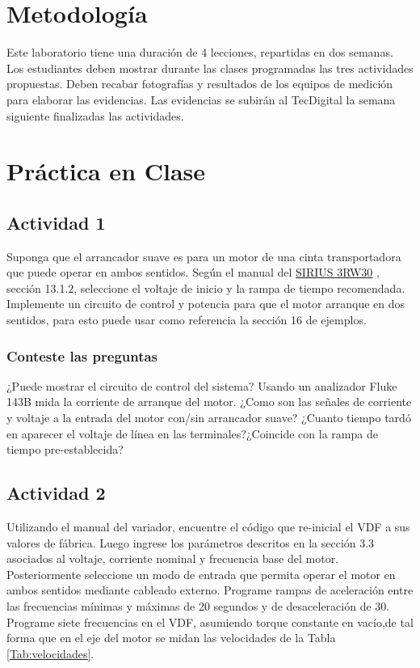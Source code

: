 \section{Metodología}

Este laboratorio tiene una duración de 4 lecciones, repartidas en dos semanas. Los estudiantes deben mostrar durante las clases programadas las tres actividades propuestas. Deben recabar fotografías y resultados de los equipos de medición para elaborar las evidencias. Las evidencias se subirán al TecDigital la semana siguiente finalizadas las actividades.

\section{Práctica en Clase}

\subsection{Actividad 1}

Suponga que el arrancador suave es para un motor de una cinta transportadora que puede operar en ambos sentidos. Según el manual del \href{https://support.industry.siemens.com/dl/files/095/38752095/att_1310813/v1/Manual_softstarter_3RW30_3RW40_es-MX.pdf}{SIRIUS 3RW30} \cite{SIEMENS}, sección 13.1.2, seleccione el voltaje de inicio y la rampa de tiempo recomendada.
Implemente un circuito de control y potencia para que el motor arranque en dos sentidos, para esto puede usar como referencia la sección 16 de ejemplos. 
 
\subsubsection{Conteste las preguntas}

¿Puede mostrar el circuito de control del sistema?
Usando un analizador Fluke 143B  mida la corriente de arranque del motor.
¿Como son las señales de corriente y voltaje a la entrada del motor con/sin arrancador suave?
¿Cuanto tiempo tardó en aparecer el voltaje de línea en las terminales?¿Coincide con la rampa de tiempo pre-establecida?

\subsection{Actividad 2}
 

Utilizando el manual del variador, encuentre el código que re-inicial el VDF a sus valores de fábrica.
Luego ingrese los parámetros descritos en la sección 3.3 asociados al voltaje, corriente nominal y frecuencia base del motor.
Posteriormente seleccione un modo de entrada que permita operar el motor en ambos sentidos mediante cableado externo.
Programe rampas de aceleración entre las frecuencias mínimas y máximas de 20 segundos y de desaceleración de 30.
Programe siete frecuencias en el VDF, asumiendo torque constante en vacío,de tal forma que en el eje del motor se midan las velocidades de la Tabla \ref{Tab:velocidades}.

